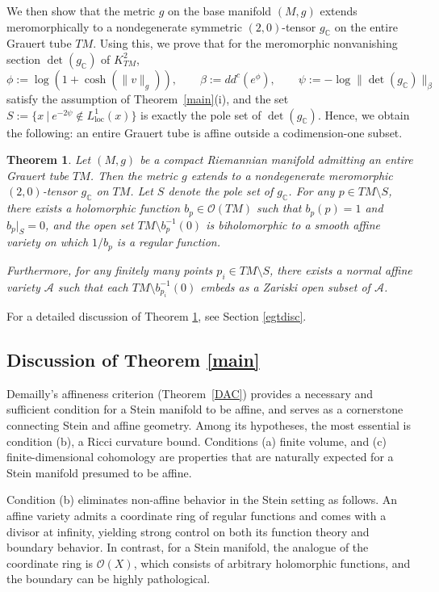 \documentclass[a4paper, 12pt]{article}
\newcommand{\cA}{\mathcal{A}}
\newcommand{\loc}{\mathrm{loc}}
\newcommand{\gC}{g_{\mathbb{C}}}
\newtheorem{thm}{Theorem}[section]
\begin{document}
We then show that the metric $g$ on the base manifold $(M,g)$ extends meromorphically to a nondegenerate symmetric $(2,0)$-tensor $\gC$ on the entire Grauert tube $TM$. Using this, we prove that for the meromorphic nonvanishing section $\det(\gC)$ of $K_{TM}^2$, 
\[\phi:=\log(1+\cosh(\|v\|_g)),\qquad \beta:= dd^c (e^\phi),  \qquad\psi:=-\log\|\det(\gC)\|_\beta\]
satisfy the assumption of Theorem~\ref{main}(i), and the set $S:=\{x~|~e^{-2\psi}\notin L^1_\loc(x)\}$ is exactly the pole set of $\det(\gC)$. Hence, we obtain the following: an entire Grauert tube is affine outside a codimension-one subset.

\begin{thm}\label{egt}
Let $(M,g)$ be a compact Riemannian manifold admitting an entire Grauert tube $TM$. Then the metric $g$ extends to a nondegenerate meromorphic $(2,0)$-tensor $\gC$ on $TM$. Let $S$ denote the pole set of $\gC$. For any $p \in TM \setminus S$, there exists a holomorphic function $b_p \in \mathcal{O}(TM)$ such that $b_p(p)=1$ and $b_p|_S=0$, and the open set $TM \setminus b_p^{-1}(0)$ is biholomorphic to a smooth affine variety on which $1/b_p$ is a regular function.

Furthermore, for any finitely many points $p_i\in TM\setminus S$, there exists a normal affine variety $\cA$ such that each $TM\setminus b_{p_i}^{-1}(0)$ embeds as a Zariski open subset of $\cA$.
\end{thm}
For a detailed discussion of Theorem \ref{egt}, see Section \ref{egtdisc}.
\subsection{Discussion of Theorem \ref{main}}

Demailly's affineness criterion (Theorem~\ref{DAC}) provides a necessary and sufficient condition for a Stein manifold to be affine, and serves as a cornerstone connecting Stein and affine geometry. Among its hypotheses, the most essential is condition (b), a Ricci curvature bound. Conditions (a) finite volume, and (c) finite-dimensional cohomology are properties that are naturally expected for a Stein manifold presumed to be affine.

Condition (b) eliminates non-affine behavior in the Stein setting as follows. An affine variety admits a coordinate ring of regular functions and comes with a divisor at infinity, yielding strong control on both its function theory and boundary behavior. In contrast, for a Stein manifold, the analogue of the coordinate ring is $\mathcal{O}(X)$, which consists of arbitrary holomorphic functions, and the boundary can be highly pathological. 
\end{document}
